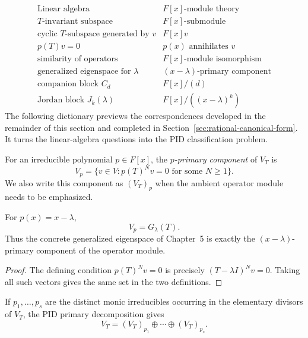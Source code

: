 \[
\begin{array}{c|c}
\text{Linear algebra}&F[x]\text{-module theory}\\ \hline
T\text{-invariant subspace}&F[x]\text{-submodule}\\
\text{cyclic \(T\)-subspace generated by }v&F[x]v\\
p(T)v=0&p(x)\text{ annihilates }v\\
\text{similarity of operators}&F[x]\text{-module isomorphism}\\
\text{generalized eigenspace for }\lambda&(x-\lambda)\text{-primary component}\\
\text{companion block }C_d&F[x]/(d)\\
\text{Jordan block }J_k(\lambda)&F[x]/((x-\lambda)^k)
\end{array}
\]
The following dictionary previews the correspondences developed in the
remainder of this section and completed in
Section~\ref{sec:rational-canonical-form}. It turns the linear-algebra
questions into the PID classification problem.

\begin{definition}
For an irreducible polynomial \(p\in F[x]\), the \emph{\(p\)-primary
component} of \(V_T\) is
\[
V_p=\{v\in V:p(T)^Nv=0\text{ for some }N\geq1\}.
\]
We also write this component as \((V_T)_p\) when the ambient operator module
needs to be emphasized.
\end{definition}

\begin{proposition}
\label{prop:primary-generalized-eigenspace}
For \(p(x)=x-\lambda\),
\[
V_p=G_\lambda(T).
\]
Thus the concrete generalized eigenspace of Chapter~5 is exactly the
\((x-\lambda)\)-primary component of the operator module.
\end{proposition}
\begin{proof}
The defining condition \(p(T)^Nv=0\) is precisely
\((T-\lambda I)^Nv=0\).  Taking all such vectors gives the same set in the
two definitions.
\end{proof}

If \(p_1,\ldots,p_s\) are the distinct monic irreducibles occurring in the
elementary divisors of \(V_T\), the PID primary decomposition gives
\[
V_T=(V_T)_{p_1}\oplus\cdots\oplus(V_T)_{p_s}.
\]

